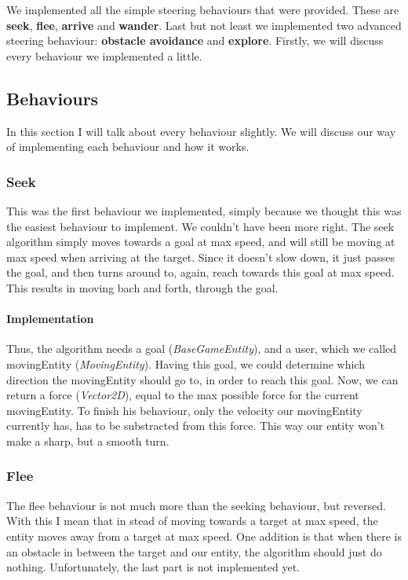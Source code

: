 We implemented all the simple steering behaviours that were provided.
These are \textbf{seek}, \textbf{flee}, \textbf{arrive} and \textbf{wander}.
Last but not least we implemented two advanced steering behaviour: \textbf{obstacle avoidance} and \textbf{explore}.
Firstly, we will discuss every behaviour we implemented a little.
\subsection[Describing the steering behaviours]{Behaviours}\label{subsec:behaviours}
In this section I will talk about every behaviour slightly.
We will discuss our way of implementing each behaviour and how it works.
\subsubsection{Seek}
This was the first behaviour we implemented, simply because we thought this was the easiest behaviour to implement.
We couldn't have been more right.
The seek algorithm simply moves towards a goal at max speed, and will still be moving at max speed when arriving at the target.
Since it doesn't slow down, it just passes the goal, and then turns around to, again, reach towards this goal at max speed.
This results in moving bach and forth, through the goal.
\paragraph{Implementation}
Thus, the algorithm needs a goal (\textit{BaseGameEntity}), and a user, which we called movingEntity (\textit{MovingEntity}).
Having this goal, we could determine which direction the movingEntity should go to, in order to reach this goal.
Now, we can return a force (\textit{Vector2D}), equal to the max possible force for the current movingEntity.
To finish his behaviour, only the velocity our movingEntity currently has, has to be substracted from this force.
This way our entity won't make a sharp, but a smooth turn.
\subsubsection{Flee}
The flee behaviour is not much more than the seeking behaviour, but reversed.
With this I mean that in stead of moving towards a target at max speed, the entity moves away from a target at max speed.
One addition is that when there is an obstacle in between the target and our entity, the algorithm should just do nothing.
Unfortunately, the last part is not implemented yet.
